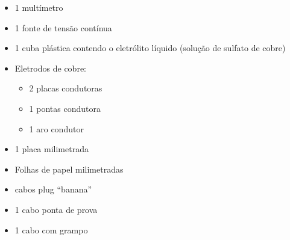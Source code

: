 \begin{itemize}
    \item 1 multímetro
    \item 1 fonte de tensão contínua
    \item 1 cuba plástica contendo o eletrólito líquido (solução de sulfato de cobre)
    \item Eletrodos de cobre:
        \begin{itemize}
            \item 2 placas condutoras
            \item 1 pontas condutora
            \item 1 aro condutor
        \end{itemize}
    \item 1 placa milimetrada
    \item Folhas de papel milimetradas
    \item cabos plug “banana”
    \item 1 cabo ponta de prova
    \item 1 cabo com grampo
\end{itemize}